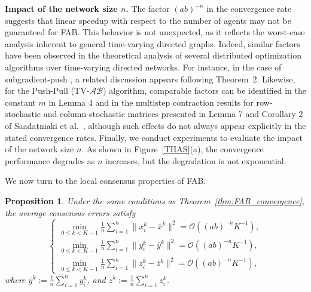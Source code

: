\documentclass{article}
\theoremstyle{plain}
\newtheorem{proposition}[theorem]{Proposition}
\theoremstyle{definition}
\theoremstyle{remark}
\begin{document}
\textbf{Impact of the network size $n$.} 
The factor $(ab)^{-n}$ in the convergence rate suggests that linear speedup with respect to the number of agents may not be guaranteed for FAB.  
This behavior is not unexpected, as it reflects the worst-case analysis inherent to general time-varying directed graphs.  
Indeed, similar factors have been observed in the theoretical analysis of several distributed optimization algorithms over time-varying directed networks.  
For instance, in the case of subgradient-push \cite{Nedic2015tvpushgd}, a related discussion appears following Theorem~2.  
Likewise, for the Push-Pull (TV-$\mathcal{AB}$) algorithm, comparable factors can be identified in the constant $m$ in Lemma 4 and in the multistep contraction results for row-stochastic and column-stochastic matrices presented in Lemma 7 and Corollary 2 of Saadatniaki et al.~, although such effects do not always appear explicitly in the stated convergence rates. 
Finally, we conduct experiments to evaluate the impact of the network size $n$. As shown in Figure~\ref{THAS}(a), the convergence performance degrades as $n$ increases, but the degradation is not exponential. 

We now turn to the local consensus properties of FAB.

\begin{proposition}
\label{prop:consensus_error}
    Under the same conditions as Theorem~\ref{thm:FAB_convergence}, the average consensus errors satisfy
    \begin{equation}
    \begin{cases}
    \min_{0 \le k < K-1} \frac{1}{n}\sum_{i=1}^{n} \|x_{i}^{k} - \bar{x}^k\|^2 = \mathcal{O}\left( (ab)^{-n} K^{-1} \right),\\
    \min_{0 \le k < K-1} \frac{1}{n}\sum_{i=1}^{n} \|y_{i}^{k} - \bar{y}^k\|^2 = \mathcal{O}\left( (ab)^{-n} K^{-1} \right),\\
    \min_{0 \le k < K-1} \frac{1}{n}\sum_{i=1}^{n} \|z_{i}^{k} - \bar{z}^k\|^2 = \mathcal{O}\left( (ab)^{-n} K^{-1} \right),
    \end{cases}
    \end{equation}
    where $\bar{y}^k := \frac{1}{n}\sum_{i=1}^{n} y_{i}^{k}$, and $\bar{z}^k := \frac{1}{n}\sum_{i=1}^{n} z_{i}^{k}$.
\end{proposition}
\end{document}
